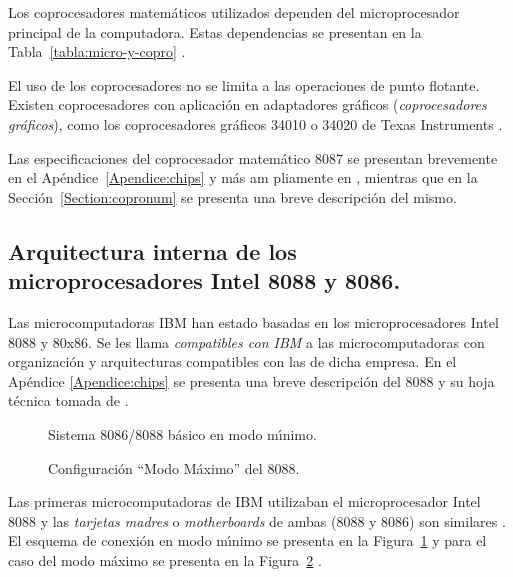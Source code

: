 Los coprocesadores matem\'aticos utilizados dependen del microprocesador principal de la %
computadora. Estas dependencias se presentan en la Tabla~\ref{tabla:micro-y-copro} %
\cite{Godfrey}.

El uso de los coprocesadores no se limita a las operaciones de punto flotante. Existen %
coprocesadores con aplicaci\'on en adaptadores gr\'aficos ({\it coprocesadores %
gr\'aficos\/}), como los coprocesadores gr\'aficos 34010 o 34020 de Texas Instruments %
\cite{PC-Mag:V4N2}.

Las es\-pe\-ci\-fi\-ca\-cio\-nes del co\-pro\-ce\-sa\-dor ma\-te\-m\'a\-ti\-co 8087 se %
pre\-sen\-tan bre\-ve\-men\-te en el A\-p\'en\-di\-ce~\ref{Apendice:chips} y m\'as am\-%
plia\-men\-te en \cite{Intel:Micro}, mientras que en la Secci\'on~\ref{Section:copronum} se %
presenta una breve des\-crip\-ci\'on del mismo.


\subsection{Ar\-qui\-tec\-tu\-ra in\-ter\-na de los\\mi\-cro\-pro\-ce\-sa\-do\-res %
Intel 8088 y 8086.}
\label{Subseccion:arquitectura}

Las microcomputadoras IBM han estado basadas en los microprocesadores Intel 8088 y 80x86. Se les %
llama {\em compatibles con IBM} a las microcomputadoras con organizaci\'on y arquitecturas %
compatibles con las de dicha empresa. En el Ap\'endice \ref{Apendice:chips} se presenta una %
breve descripci\'on del 8088 y su hoja t\'ecnica tomada de \cite{Intel:Micro}.

\begin{figure}[!htb]
\vskip 5mm
\vskip 90mm
\caption{Sistema 8086/8088 b\'asico en modo m\'{\i}nimo.} 
\label{modomin}
\end{figure}

\begin{figure}[!hbt]
\vskip 5mm
\vskip 90mm
\caption{Configuraci\'on ``Modo M\'aximo'' del 8088.} 
\label{modomax}
\end{figure}

Las primeras microcomputadoras de IBM utilizaban el microprocesador Intel 8088 y las {\em %
tarjetas madres} o {\em motherboards} de ambas (8088 y 8086) son similares \cite{Godfrey}. El %
esquema de conexi\'on en modo m\'{\i}nimo se presenta en la Figura~\ref{modomin} y para el %
caso del modo m\'aximo se presenta en la Figura~\ref{modomax} \cite{Hall}. 

